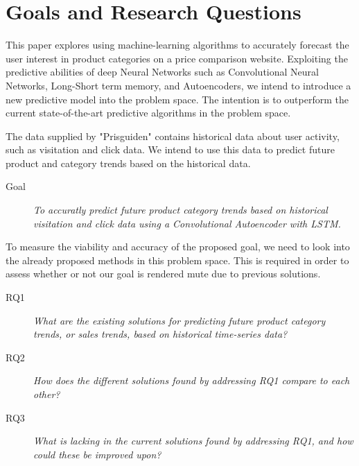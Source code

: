 \section{Goals and Research Questions}
\label{section:Introduction:Goal}


This paper explores using machine-learning algorithms to accurately forecast the user interest in product categories on a price comparison website.
Exploiting the predictive abilities of deep Neural Networks such as Convolutional Neural Networks, Long-Short term memory, and Autoencoders,
we intend to introduce a new predictive model into the problem space.
The intention is to outperform the current state-of-the-art predictive algorithms in the problem space.

The data supplied by "Prisguiden" contains historical data about user activity, such as visitation and click data.
We intend to use this data to predict future product and category trends based on the historical data.

\begin{description}
    \item[Goal]{\it To accuratly predict future product category trends based on historical visitation and click data using a Convolutional Autoencoder with LSTM.}
\end{description}

To measure the viability and accuracy of the proposed goal, we need to look into the already proposed methods in this problem space.
This is required in order to assess whether or not our goal is rendered mute due to previous solutions.


\begin{description}
    \item[RQ1]{\it What are the existing solutions for predicting future product category trends, or sales trends, based on historical time-series data?}
\end{description}

\begin{description}
    \item[RQ2]{\it How does the different solutions found by addressing RQ1 compare to each other?}
\end{description}

\begin{description}
    \item[RQ3]{\it What is lacking in the current solutions found by addressing RQ1, and how could these be improved upon?}
\end{description}


